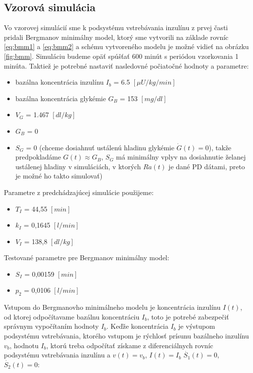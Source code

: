 \documentclass[11pt]{article} %
\begin{document}
\vspace{5mm}

\subsection{Vzorová simulácia}
Vo vzorovej simulácií sme k podsystému vstrebávania inzulínu z prvej časti pridali Bergmanov minimálny model, ktorý sme vytvorili na základe rovníc  \ref{eq:bmm1} a \ref{eq:bmm2} a schému vytvoreného modelu je možné vidieť na obrázku \ref{fig:bmm}. Simuláciu budeme opäť spúšťať 600 minút s periódou vzorkovania 1 minúta. Taktiež je potrebné nastaviť nasledovné počiatočné hodnoty a parametre:
\begin{itemize}
\item bazálna koncentrácia inzulínu $I_b$ = 6.5 $[\mu U/kg/min]$
\item bazálna koncentrácia glykémie $G_B$ = 153 $[mg/dl]$
\item $V_G$ = 1.467 $[dl/kg]$
\item $G_B$ = 0
\item $S_G$ = 0 (chceme dosiahnuť ustálenú hladinu glykémie $\dot{G}(t)  = 0$), takže predpokladáme $G(t) \approx G_B$, $S_G$ má minimálny vplyv na dosiahnutie želanej ustálenej hladiny v simuláciách, v ktorých $Ra(t)$ je dané PD dátami, preto je možné ho takto simulovať)
\end{itemize}

Parametre z predchádzajúcej simulácie použijeme:
\begin{itemize}
\item $T_I$ = 44,55  $[min]$
\item $k_I$ = 0,1645 $[l/min]$ 
\item $V_I$ = 138,8 $[dl/kg]$ 
\end{itemize}

Testované parametre pre Bergmanov minimálny model:
\begin{itemize}
\item $S_I$ = 0,00159 $[min]$
\item $p_2$ = 0,0106 $[l/min]$ 
\end{itemize}


Vstupom do Bergmanovho minimálneho modelu je koncentrácia inzulínu $I(t)$, od ktorej odpočítavame bazálnu koncentráciu $I_b$, toto je potrebé zabezpečiť správnym vypočítaním hodnoty $I_b$. Keďže koncentrácia $I_b$ je výstupom podsystému vstrebávania, ktorého vstupom je rýchlosť prísunu bazálneho inzulínu $v_b$, hodnotu $I_b$, ktorú treba odpočítať získame z diferenciálnych rovníc podsystému vstrebávania inzulínu a $v(t) = v_b$, $I(t) = I_b$ $\dot{S_1}(t) = 0$, $\dot{S_2}(t) = 0$:
\end{document}
